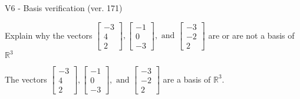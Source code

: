 \begin{exercise}
  \begin{exerciseTitle}V6 - Basis verification (ver. 171)\end{exerciseTitle}
  \begin{exerciseStatement}
    Explain why the vectors \(\left[\begin{array}{r}
-3 \\
4 \\
2
\end{array}\right] , \left[\begin{array}{r}
-1 \\
0 \\
-3
\end{array}\right] , \text{ and } \left[\begin{array}{r}
-3 \\
-2 \\
2
\end{array}\right]\) are or are not a basis of \(\mathbb{R}^3\)	


  \end{exerciseStatement}
  \begin{exerciseAnswer}
   The vectors \(\left[\begin{array}{r}
-3 \\
4 \\
2
\end{array}\right] , \left[\begin{array}{r}
-1 \\
0 \\
-3
\end{array}\right] , \text{ and } \left[\begin{array}{r}
-3 \\
-2 \\
2
\end{array}\right]\) 
  	 are  a basis of \(\mathbb{R}^3\).
  


  \end{exerciseAnswer}
\end{exercise}